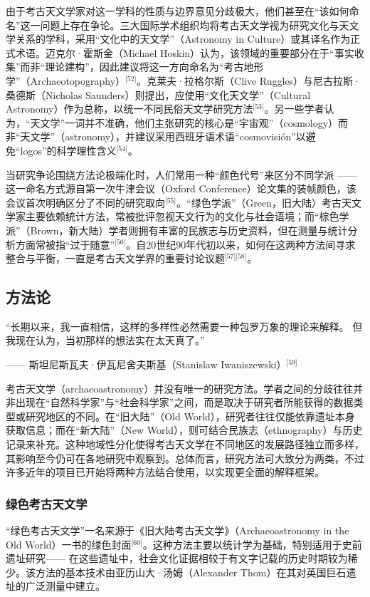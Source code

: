 由于考古天文学家对这一学科的性质与边界意见分歧极大，他们甚至在“该如何命名”这一问题上存在争论。三大国际学术组织均将考古天文学视为研究文化与天文学关系的学科，采用“文化中的天文学”（Astronomy in Culture）或其译名作为正式术语。迈克尔·霍斯金（Michael Hoskin）认为，该领域的重要部分在于“事实收集”而非“理论建构”，因此建议将这一方向命名为“考古地形学”（Archaeotopography）\(^\text{[52]}\)。克莱夫·拉格尔斯（Clive Ruggles）与尼古拉斯·桑德斯（Nicholas Saunders）则提出，应使用“文化天文学”（Cultural Astronomy）作为总称，以统一不同民俗天文学研究方法\(^\text{[53]}\)。另一些学者认为，“天文学”一词并不准确，他们主张研究的核心是“宇宙观”（cosmology）而非“天文学”（astronomy），并建议采用西班牙语术语“cosmovisión”以避免“logos”的科学理性含义\(^\text{[54]}\)。

当研究争论围绕方法论极端化时，人们常用一种“颜色代号”来区分不同学派 —— 这一命名方式源自第一次牛津会议（Oxford Conference）论文集的装帧颜色，该会议首次明确区分了不同的研究取向\(^\text{[55]}\)。“绿色学派”（Green，旧大陆）考古天文学家主要依赖统计方法，常被批评忽视天文行为的文化与社会语境；而“棕色学派”（Brown，新大陆）学者则拥有丰富的民族志与历史资料，但在测量与统计分析方面常被指“过于随意”\(^\text{[56]}\)。自20世纪90年代初以来，如何在这两种方法间寻求整合与平衡，一直是考古天文学界的重要讨论议题\(^\text{[57][58]}\)。
\subsection{方法论}
“长期以来，我一直相信，这样的多样性必然需要一种包罗万象的理论来解释。  
但我现在认为，当初那样的想法实在太天真了。”

—— 斯坦尼斯瓦夫·伊瓦尼舍夫斯基（Stanislaw Iwaniszewski）\(^\text{[59]}\)

考古天文学（archaeoastronomy）并没有唯一的研究方法。学者之间的分歧往往并非出现在“自然科学家”与“社会科学家”之间，而是取决于研究者所能获得的数据类型或研究地区的不同。在“旧大陆”（Old World），研究者往往仅能依靠遗址本身获取信息；而在“新大陆”（New World），则可结合民族志（ethnography）与历史记录来补充。这种地域性分化使得考古天文学在不同地区的发展路径独立而多样，其影响至今仍可在各地研究中观察到。总体而言，研究方法可大致分为两类，不过许多近年的项目已开始将两种方法结合使用，以实现更全面的解释框架。
\subsubsection{绿色考古天文学}
“绿色考古天文学”一名来源于《旧大陆考古天文学》（Archaeoastronomy in the Old World）一书的绿色封面\(^\text{[60]}\)。这种方法主要以统计学为基础，特别适用于史前遗址研究—— 在这些遗址中，社会文化证据相较于有文字记载的历史时期较为稀少。该方法的基本技术由亚历山大·汤姆（Alexander Thom）在其对英国巨石遗址的广泛测量中建立。

